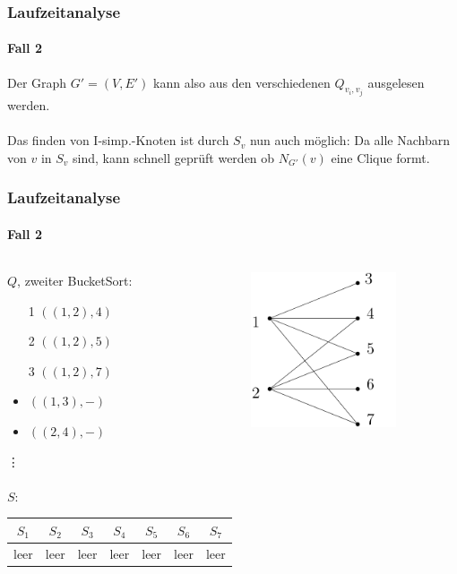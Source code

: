 \begin{frame}
\frametitle{Laufzeitanalyse}
\framesubtitle{Fall 2}

Der Graph $G' = (V,E')$ kann also aus den verschiedenen $Q_{v_i,v_j}$ ausgelesen werden. \\
\ \\
Das finden von I-simp.-Knoten ist durch $S_v$ nun auch möglich: Da alle Nachbarn von $v$ in $S_v$ sind, kann schnell geprüft werden ob $N_{G'}(v)$ eine Clique formt.

\end{frame}


\begin{frame}[t]
\frametitle{Laufzeitanalyse}
\framesubtitle{Fall 2}

\begin{columns}
	\begin{block}{$Q$, zweiter BucketSort:}
		\begin{itemize}
			\item[1] $((1,2), 4)$
			\item[2] $((1,2), 5)$
			\item[3] $((1,2), 7)$
			\item $((1,3), -)$
			\item $((2,4), -)$
		\end{itemize}
	\vdots
	\ \\
	\ \\
	$S$: \\
	\begin{tabular}{| c | c | c | c | c | c | c |}
		\hline
		$S_1$ & $S_2$ & $S_3$ & $S_4$ & $S_5$ & $S_6$ & $S_7$ \\
		\hline
		{\scriptsize leer} & {\scriptsize leer} & {\scriptsize leer} & {\scriptsize leer} & {\scriptsize leer} & {\scriptsize leer} & {\scriptsize leer} \\
		\hline
	\end{tabular}
	\end{block}
	
	\includegraphics[width=0.7\textwidth]{images/Graph_Queue_1.png}
\end{columns}
\end{frame}


